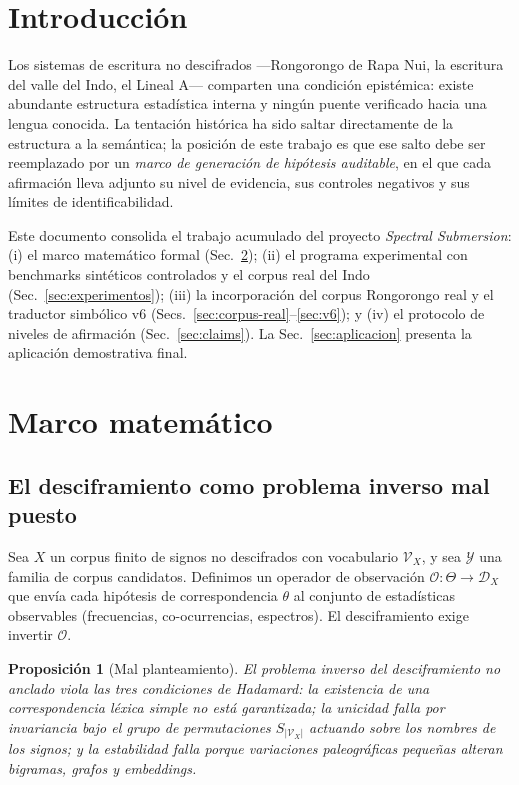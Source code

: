 \documentclass[10pt,twocolumn]{article}
\newtheorem{proposition}[theorem]{Proposición}
\begin{document}
\section{Introducción}

Los sistemas de escritura no descifrados —Rongorongo de Rapa Nui, la
escritura del valle del Indo, el Lineal A— comparten una condición
epistémica: existe abundante estructura estadística interna y ningún
puente verificado hacia una lengua conocida. La tentación histórica ha
sido saltar directamente de la estructura a la semántica; la posición de
este trabajo es que ese salto debe ser reemplazado por un \emph{marco de
generación de hipótesis auditable}, en el que cada afirmación lleva
adjunto su nivel de evidencia, sus controles negativos y sus límites de
identificabilidad.

Este documento consolida el trabajo acumulado del proyecto
\emph{Spectral Submersion}: (i) el marco matemático formal
(Sec.~\ref{sec:marco}); (ii) el programa experimental con benchmarks
sintéticos controlados y el corpus real del Indo
(Sec.~\ref{sec:experimentos}); (iii) la incorporación del corpus
Rongorongo real y el traductor simbólico v6
(Secs.~\ref{sec:corpus-real}--\ref{sec:v6}); y (iv) el protocolo de
niveles de afirmación (Sec.~\ref{sec:claims}). La
Sec.~\ref{sec:aplicacion} presenta la aplicación demostrativa final.

\section{Marco matemático}
\label{sec:marco}

\subsection{El desciframiento como problema inverso mal puesto}

Sea $X$ un corpus finito de signos no descifrados con vocabulario
$\mathcal{V}_X$, y sea $\mathcal{Y}$ una familia de corpus candidatos.
Definimos un operador de observación $\mathcal{O}:\Theta\to\mathcal{D}_X$
que envía cada hipótesis de correspondencia $\theta$ al conjunto de
estadísticas observables (frecuencias, co-ocurrencias, espectros). El
desciframiento exige invertir $\mathcal{O}$.

\begin{proposition}[Mal planteamiento]
\label{prop:hadamard}
El problema inverso del desciframiento no anclado viola las tres
condiciones de Hadamard: la existencia de una correspondencia léxica
simple no está garantizada; la unicidad falla por invariancia bajo el
grupo de permutaciones $S_{|\mathcal{V}_X|}$ actuando sobre los nombres de
los signos; y la estabilidad falla porque variaciones paleográficas
pequeñas alteran bigramas, grafos y embeddings.
\end{proposition}
\end{document}

